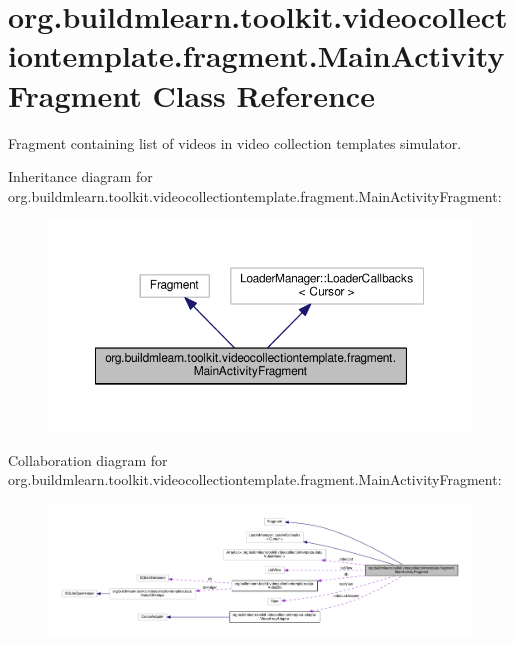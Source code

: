 \hypertarget{classorg_1_1buildmlearn_1_1toolkit_1_1videocollectiontemplate_1_1fragment_1_1MainActivityFragment}{}\section{org.\+buildmlearn.\+toolkit.\+videocollectiontemplate.\+fragment.\+Main\+Activity\+Fragment Class Reference}
\label{classorg_1_1buildmlearn_1_1toolkit_1_1videocollectiontemplate_1_1fragment_1_1MainActivityFragment}


Fragment containing list of videos in video collection template\textquotesingle{}s simulator.  




Inheritance diagram for org.\+buildmlearn.\+toolkit.\+videocollectiontemplate.\+fragment.\+Main\+Activity\+Fragment\+:
\nopagebreak
\begin{figure}[H]
\begin{center}
\leavevmode
\includegraphics[width=350pt]{classorg_1_1buildmlearn_1_1toolkit_1_1videocollectiontemplate_1_1fragment_1_1MainActivityFragment__inherit__graph}
\end{center}
\end{figure}


Collaboration diagram for org.\+buildmlearn.\+toolkit.\+videocollectiontemplate.\+fragment.\+Main\+Activity\+Fragment\+:
\nopagebreak
\begin{figure}[H]
\begin{center}
\leavevmode
\includegraphics[width=350pt]{classorg_1_1buildmlearn_1_1toolkit_1_1videocollectiontemplate_1_1fragment_1_1MainActivityFragment__coll__graph}
\end{center}
\end{figure}
